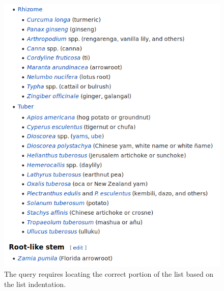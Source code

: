 \begin{figure}[tp]
\centering
\includegraphics[scale=0.45]{figures/openweb/openweb-tubers.png}
\caption[
The query 
requires compositional understanding.
]{The query 
requires locating the correct portion of the list
based on the list indentation.}
\label{fig:openweb-tubers}
\end{figure}


